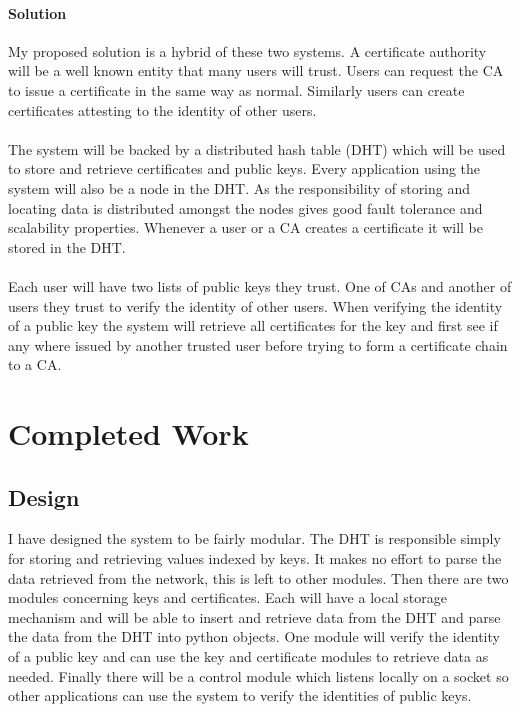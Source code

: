 \documentclass[10pt, a4paper]{article}
\begin{document}
\paragraph{Solution}
My proposed solution is a hybrid of these two systems. A certificate authority will be a well known entity that many users will trust. Users can request the CA to issue a certificate in the same way as normal. Similarly users can create certificates attesting to the identity of other users. 
\paragraph{}
The system will be backed by a distributed hash table (DHT) which will be used to store and retrieve certificates and public keys. Every application using the system will also be a node in the DHT\@. As the responsibility of storing and locating data is distributed amongst the nodes gives good fault tolerance and scalability properties. Whenever a user or a CA creates a certificate it will be stored in the DHT.
\paragraph{}
Each user will have two lists of public keys they trust. One of CAs and another of users they trust to verify the identity of other users. When verifying the identity of a public key the system will retrieve all certificates for the key and first see if any where issued by another trusted user before trying to form a certificate chain to a CA.

\section{Completed Work}
\subsection{Design}
I have designed the system to be fairly modular. The DHT is responsible simply for storing and retrieving values indexed by keys. It makes no effort to parse the data retrieved from the network, this is left to other modules. Then there are two modules concerning keys and certificates. Each will have a local storage mechanism and will be able to insert and retrieve data from the DHT and parse the data from the DHT into python objects. One module will verify the identity of a public key and can use the key and certificate modules to retrieve data as needed. Finally there will be a control module which listens locally on a socket so other applications can use the system to verify the identities of public keys.  
\end{document}
